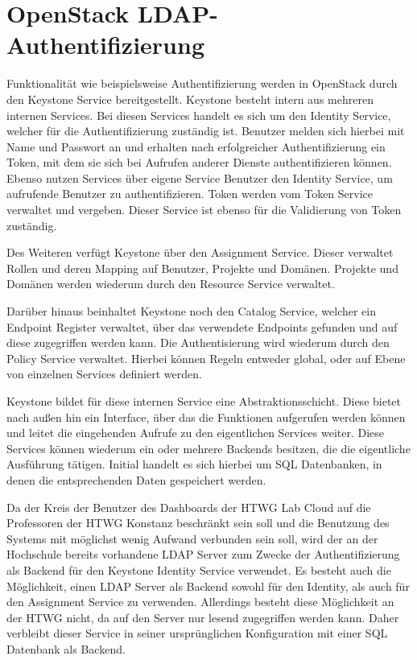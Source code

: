 \section{OpenStack LDAP-Authentifizierung}\label{ldap_auth1}
Funktionalität wie beispielsweise Authentifizierung werden in OpenStack durch den Keystone Service bereitgestellt.
Keystone besteht intern aus mehreren internen Services. Bei diesen Services handelt es sich um den Identity Service, welcher für die Authentifizierung zuständig ist. Benutzer melden sich hierbei mit Name und Passwort an und erhalten nach erfolgreicher Authentifizierung ein Token, mit dem sie sich bei Aufrufen anderer Dienste authentifizieren können. Ebenso nutzen Services über eigene Service Benutzer den Identity Service, um aufrufende Benutzer zu authentifizieren. Token werden vom Token Service verwaltet und vergeben. Dieser Service ist ebenso für die Validierung von Token zuständig.

Des Weiteren verfügt Keystone über den Assignment Service. Dieser verwaltet Rollen und deren Mapping auf Benutzer, Projekte und Domänen. Projekte und Domänen werden wiederum durch den Resource Service verwaltet.

Darüber hinaus beinhaltet Keystone noch den Catalog Service, welcher ein Endpoint Register verwaltet, über das verwendete Endpoints gefunden und auf diese zugegriffen werden kann. Die Authentisierung wird wiederum durch den Policy Service verwaltet. Hierbei können Regeln entweder global, oder auf Ebene von einzelnen Services definiert werden.

Keystone bildet für diese internen Service eine Abstraktionsschicht. Diese bietet nach außen hin ein Interface, über das die Funktionen aufgerufen werden können und leitet die eingehenden Aufrufe zu den eigentlichen Services weiter. Diese Services können wiederum ein oder mehrere Backends besitzen, die die eigentliche Ausführung tätigen. Initial handelt es sich hierbei um SQL Datenbanken, in denen die entsprechenden Daten gespeichert werden.

Da der Kreis der Benutzer des Dashboards der HTWG Lab Cloud auf die Professoren der HTWG Konstanz beschränkt sein soll und die Benutzung des Systems mit möglichst wenig Aufwand verbunden sein soll, wird der an der Hochschule bereits vorhandene LDAP Server zum Zwecke der Authentifizierung als Backend für den Keystone Identity Service verwendet.
Es besteht auch die Möglichkeit, einen LDAP Server als Backend sowohl für den Identity, als auch für den Assignment Service zu verwenden. Allerdings besteht diese Möglichkeit an der HTWG nicht, da auf den Server nur lesend zugegriffen werden kann. Daher verbleibt dieser Service in seiner ursprünglichen Konfiguration mit einer SQL Datenbank als Backend.

